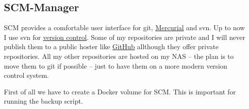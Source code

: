

\subsection{SCM-Manager}

\gls{SCM} provides a comfortable user interface for \gls{git},
\href{https://www.mercurial-scm.org}{Mercurial} and \gls{svn}. Up to now I use
\gls{svn} for \href{https://en.wikipedia.org/wiki/Version_control}{version control}.
Some of my repositories are private and I will never publish them to a public
hoster like \href{https://github.com}{GitHub} allthough they offer private
repositories. All my other repositories are hosted on my \gls{NAS} -- the plan
is to move them to \gls{git} if possible -- just to have them on a more modern
version control system.
\bigbreak

First of all we have to create a \gls{Docker} volume for \gls{SCM}. This is
important for running the backup script.


